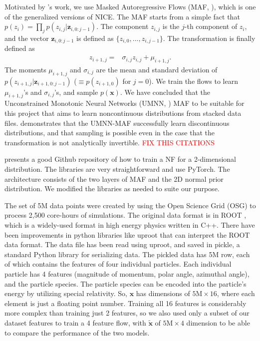 Motivated by \cite{Weisser2021ThePhysics}'s work, we use Masked Autoregressive Flows (MAF, \cite{Papamakarios2017MaskedEstimation}), which is one of the generalized versions of NICE. The MAF starts from a simple fact that $p(z_{i}) = \prod\limits_{j}p(z_{i,j}|\mathbf{z}_{i,0:j-1})$. The component $z_{i,j}$ is the $j$-th component of $z_i$, and the vector $\mathbf{z}_{i,0:j-1}$ is defined as $\{z_{i, 0}, ..., z_{i, j-1}\}$. The transformation is finally defined as
\begin{align}
    z_{i+1, j}=& \sigma_{i, j} z_{i, j} + \mu_{i+1, j}.
\end{align}
The moments $\mu_{i+1, j}$ and $\sigma_{i, j}$ are the mean and standard deviation of $p(z_{i+1,j}|\mathbf{z}_{i+1,0:j-1})$ ($\equiv p(z_{i+1,0})$ for $j=0$). We train the flows to learn $\mu_{i+1, j}$'s and $\sigma_{i, j}$'s, and sample $p(\mathbf{x})$. We have concluded that the Unconstrained Monotonic Neural Networks (UMNN, \cite{Wehenkel2019UnconstrainedNetworks}) MAF to be suitable for this project that aims to learn noncontinuous distributions from stacked data files. \cite{Wehenkel2019UnconstrainedNetworks} demonstrates that the UMNN-MAF successfully learn discontinuous distributions, and that sampling is possible even in the case that the transformation is not analytically invertible. \textcolor{red}{FIX THIS CITATIONS}

\cite{Durkan2020Nflows:PyTorch} presents a good Github repository of how to train a NF for a 2-dimensional distribution. The libraries are very straightforward and use PyTorch. The architecture consists of the two layers of MAF and the 2D normal prior distribution. We modified the libraries as needed to suite our purpose.


The set of 5M data points were created by using the Open Science Grid (OSG) to process 2,500 core-hours of simulations. The original data format is in ROOT \cite{Brun1997ROOTFramework}, which is a widely-used format in high energy physics written in C++. There have been improvements in python libraries like uproot \cite{Pivarski2022Scikit-hep/uproot4:4.2.1} that can interpret the ROOT data format. The data file has been read using uproot, and saved in pickle, a standard Python library for serializing data. The pickled data has 5M row, each of which contains the features of four individual particles. Each individual particle has 4 features (magnitude of momentum, polar angle, azimuthal angle), and the particle species. The particle species can be encoded into the particle's energy by utilizing special relativity. So, $\mathbf{x}$ has dimensions of $5\text{M}\times16$, where each element is just a floating point number. Training all 16 features is considerably more complex than training just 2 features, so we also used only a subset of our dataset features to train a 4 feature flow, with $\mathbf{\tilde{x}}$ of $5\text{M}\times4$ dimension to be able to compare the performance of the two models. 

